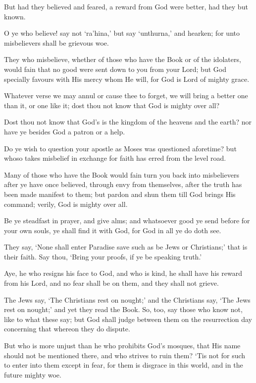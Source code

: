 \documentclass[fontsize=14pt, letterpaper, notitlepage, openany, DIV=12]{scrbook} %
\begin{document}
\noindent[2:103]
But had they believed and feared, a reward from God were better, had they but known.

\noindent[2:104]
O ye who believe! say not `ra'hina,' but say `unthurna,' and hearken; for unto
misbelievers shall be grievous woe.

\noindent[2:105]
They who misbelieve, whether of those who have the Book or of the idolaters, would fain
that no good were sent down to you from your Lord; but God specially favours with His mercy
whom He will, for God is Lord of mighty grace.

\noindent[2:106]
Whatever verse we may annul or cause thee to forget, we will bring a better one than it,
or one like it; dost thou not know that God is mighty over all?

\noindent[2:107]
Dost thou not know that God's is the kingdom of the heavens and the earth? nor have ye
besides God a patron or a help.

\noindent[2:108]
Do ye wish to question your apostle as Moses was questioned aforetime? but whoso takes
misbelief in exchange for faith has erred from the level road.

\noindent[2:109]
Many of those who have the Book would fain turn you back into misbelievers after ye
have once believed, through envy from themselves, after the truth has been made manifest to
them; but pardon and shun them till God brings His command; verily, God is mighty over all.

\noindent[2:110]
Be ye steadfast in prayer, and give alms; and whatsoever good ye send before for your
own souls, ye shall find it with God, for God in all ye do doth see.

\noindent[2:111]
They say, `None shall enter Paradise save such as be Jews or Christians;' that is their
faith. Say thou, `Bring your proofs, if ye be speaking truth.'

\noindent[2:112]
Aye, he who resigns his face to God, and who is kind, he shall have his reward from his
Lord, and no fear shall be on them, and they shall not grieve.

\noindent[2:113]
The Jews say, `The Christians rest on nought;' and the Christians say, `The Jews rest on
nought;' and yet they read the Book. So, too, say those who know not, like to what these say; but
God shall judge between them on the resurrection day concerning that whereon they do dispute.

\noindent[2:114]
But who is more unjust than he who prohibits God's mosques, that His name should not
be mentioned there, and who strives to ruin them? `Tis not for such to enter into them except in
fear, for them is disgrace in this world, and in the future mighty woe.
\end{document}
